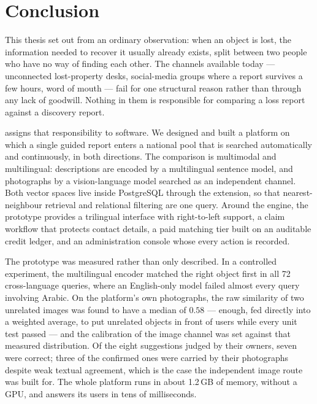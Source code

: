 \chapter*{Conclusion}

This thesis set out from an ordinary observation: when an object is lost, the
information needed to recover it usually already exists, split between two
people who have no way of finding each other. The channels available today ---
unconnected lost-property desks, social-media groups where a report survives a
few hours, word of mouth --- fail for one structural reason rather than through
any lack of goodwill. Nothing in them is responsible for comparing a loss report
against a discovery report.

\projectname{} assigns that responsibility to software. We designed and built a
platform on which a single guided report enters a national pool that is searched
automatically and continuously, in both directions. The comparison is multimodal
and multilingual: descriptions are encoded by a multilingual sentence model, and
photographs by a vision-language model searched as an independent channel. Both
vector spaces live inside PostgreSQL through the  extension, so
that nearest-neighbour retrieval and relational filtering are one query. Around
the engine, the prototype provides a trilingual interface with right-to-left
support, a claim workflow that protects contact details, a paid matching tier
built on an auditable credit ledger, and an administration console whose every
action is recorded.

The prototype was measured rather than only described. In a controlled
experiment, the multilingual encoder matched the right object first in all 72
cross-language queries, where an English-only model failed almost every query
involving Arabic. On the platform's own photographs, the raw similarity of two
unrelated images was found to have a median of $0.58$ --- enough, fed directly
into a weighted average, to put unrelated objects in front of users while every
unit test passed --- and the calibration of the image channel was set against
that measured distribution. Of the eight suggestions judged by their owners,
seven were correct; three of the confirmed ones were carried by their
photographs despite weak textual agreement, which is the case the independent
image route was built for. The whole platform runs in about 1.2\,GB of memory,
without a GPU, and answers its users in tens of milliseconds.


